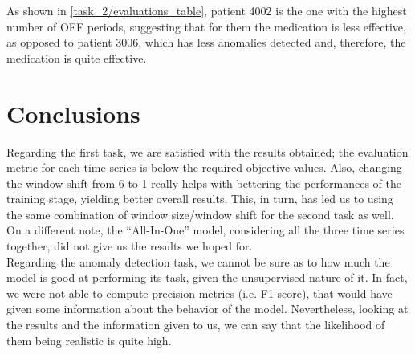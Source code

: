 \documentclass[12pt,a4paper,leqno]{article}
\begin{document}
	As shown in \autoref{task_2/evaluations_table}, patient 4002 is the one with the highest number of OFF periods, suggesting that for them the medication is less effective, as opposed to patient 3006, which has less anomalies detected and, therefore, the medication is quite effective.
	
	\newpage
	
	\section{Conclusions}
	Regarding the first task, we are satisfied with the results obtained; the evaluation metric for each time series is below the required objective values. Also, changing the window shift from 6 to 1 really helps with bettering the performances of the training stage, yielding better overall results. This, in turn, has led us to using the same combination of window size/window shift for the second task as well. On a different note, the “All-In-One” model, considering all the three time series together, did not give us the results we hoped for.\\
	Regarding the anomaly detection task, we cannot be sure as to how much the model is good at performing its task, given the unsupervised nature of it. In fact, we were not able to compute precision metrics (i.e. F1-score), that would have given some information about the behavior of the model. Nevertheless, looking at the results and the information given to us, we can say that the likelihood of them being realistic is quite high.
	
\end{document}
